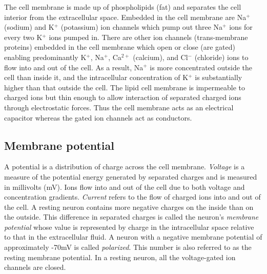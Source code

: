 The cell membrane is made up of phospholipids (fat) and separates the cell interior from the extracellular space. Embedded in the cell membrane are Na$^{+}$ (sodium) and K$^{+}$ (potassium) ion channels which pump out three Na$^{+}$ ions for every two K$^{+}$ ions pumped in. There are other ion channels (trans-membrane proteins) embedded in the cell membrane which
open or close (are gated)  enabling predominantly K$^{+}$, Na$^{+}$, Ca$^{2+}$ (calcium), and Cl$^{-}$ (chloride) ions to flow into and out of the cell. As a result, Na$^{+}$ is more concentrated outside the cell than inside it, and the intracellular concentration of K$^{+}$ is substantially higher than that outside the cell.
The lipid cell membrane is impermeable to charged ions but thin enough to allow interaction
of separated charged ions through electrostatic forces. 
Thus the cell membrane acts as an electrical capacitor whereas the gated ion channels act as conductors.

\subsection{Membrane potential}
A potential is a distribution of charge across the cell membrane.
\textit{Voltage} is a measure of the potential energy generated by separated charges and is measured in millivolts (mV). Ions flow into and out of the cell due to both voltage and concentration gradients. \textit{Current} refers to the flow of charged ions into and out of the cell. A resting neuron contains more negative charges on the inside than on the outside. 
This difference in separated charges is called the neuron's \textit{membrane potential}
whose value is represented by charge in the intracellular space relative to that in the extracellular fluid. A neuron with a negative membrane potential of approximately -70mV is called \textit{polarized}. This number is also referred to as the resting membrane potential.
In a resting neuron, all the voltage-gated ion channels are closed. 

